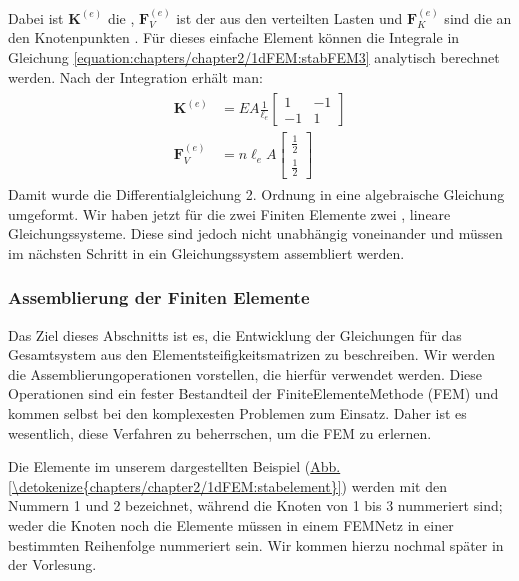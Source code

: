 \documentclass[letterpaper,10pt,german]{jupyterBook}
\begin{document}
\sphinxAtStartPar
Dabei ist \(\bm{K}^{(e)}\) die , \(\bm{F}_V^{(e)}\) ist der  aus den verteilten Lasten und \(\bm{F}_K^{(e)}\) sind die an den Knotenpunkten . Für dieses einfache Element können die Integrale in Gleichung \eqref{equation:chapters/chapter2/1dFEM:stabFEM3} analytisch berechnet werden. Nach der Integration erhält man:
\begin{equation}\label{equation:chapters/chapter2/1dFEM:stabFEM4}
\begin{split}\begin{align}
 \bm{K}^{(e)} & = EA \frac{1}{\ell_e} \begin{bmatrix} 1 & -1 \\ -1 & 1\end{bmatrix} \\
 \bm{F}_V^{(e)} & = n \ell_e A  \begin{bmatrix} \frac{1}{2} \\ \frac{1}{2} \end{bmatrix} 
\end{align}\end{split}
\end{equation}
\sphinxAtStartPar
Damit wurde die Differentialgleichung 2. Ordnung in eine algebraische Gleichung umgeformt. Wir haben jetzt für die zwei Finiten Elemente zwei , lineare Gleichungssysteme. Diese sind jedoch nicht unabhängig voneinander und müssen im nächsten Schritt in ein  Gleichungssystem assembliert werden.


\subsubsection{Assemblierung der Finiten Elemente}
\label{\detokenize{chapters/chapter2/1dFEM:assemblierung-der-finiten-elemente}}
\sphinxAtStartPar
Das Ziel dieses Abschnitts ist es, die Entwicklung der Gleichungen für das Gesamtsystem aus den Elementsteifigkeitsmatrizen zu beschreiben. Wir werden die Assemblierungoperationen vorstellen, die hierfür verwendet werden. Diese Operationen sind ein fester Bestandteil der Finite\sphinxhyphen{}Elemente\sphinxhyphen{}Methode (FEM) und kommen selbst bei den komplexesten Problemen zum Einsatz. Daher ist es wesentlich, diese Verfahren zu beherrschen, um die FEM zu erlernen.

\sphinxAtStartPar
Die Elemente im unserem dargestellten Beispiel (\hyperref[\detokenize{chapters/chapter2/1dFEM:stabelement}]{Abb.\@ \ref{\detokenize{chapters/chapter2/1dFEM:stabelement}}}) werden mit den Nummern 1 und 2 bezeichnet, während die Knoten von 1 bis 3 nummeriert sind; weder die Knoten noch die Elemente müssen in einem FEM\sphinxhyphen{}Netz in einer bestimmten Reihenfolge nummeriert sein. Wir kommen hierzu nochmal später in der Vorlesung.
\end{document}
